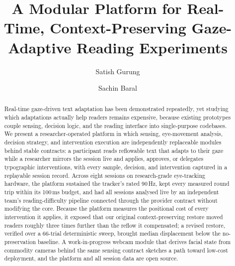 \documentclass[sigconf,screen]{acmart}
\newcommand{\draftnote}[1]{\textcolor{red}{[#1]}}
\begin{document}
\title{A Modular Platform for Real-Time, Context-Preserving Gaze-Adaptive Reading Experiments}

\author{Satish Gurung}

\author{Sachin Baral}


\begin{abstract}
Real-time gaze-driven text adaptation has been demonstrated repeatedly, yet studying which adaptations actually help readers remains expensive, because existing prototypes couple sensing, decision logic, and the reading interface into single-purpose codebases.
We present a researcher-operated platform in which sensing, eye-movement analysis, decision strategy, and intervention execution are independently replaceable modules behind stable contracts: a participant reads reflowable text that adapts to their gaze while a researcher mirrors the session live and applies, approves, or delegates typographic interventions, with every sample, decision, and intervention captured in a replayable session record.
Across eight sessions on research-grade eye-tracking hardware, the platform sustained the tracker's rated 90\,Hz, kept every measured round trip within its 100\,ms budget, and had all sessions analysed live by an independent team's reading-difficulty pipeline connected through the provider contract without modifying the core.
Because the platform measures the positional cost of every intervention it applies, it exposed that our original context-preserving restore moved readers roughly three times further than the reflow it compensated; a revised restore, verified over a 66-trial deterministic sweep, brought median displacement below the no-preservation baseline.
A work-in-progress webcam module that derives facial state from commodity cameras behind the same sensing contract sketches a path toward low-cost deployment, and the platform and all session data are open source.
\end{abstract}
\end{document}
